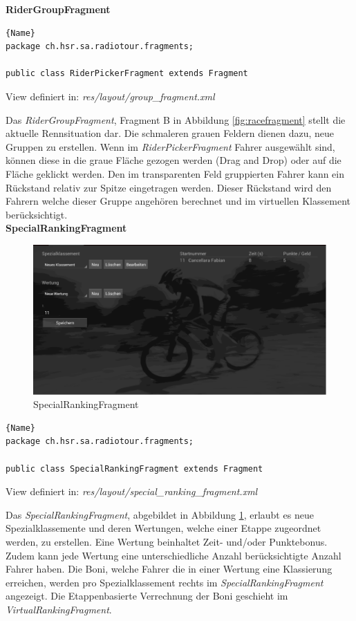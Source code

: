 \textbf{RiderGroupFragment}
\begin{lstlisting}{Name}
package ch.hsr.sa.radiotour.fragments;

public class RiderPickerFragment extends Fragment
\end{lstlisting}


View definiert in:
\textit{res/layout/group\_fragment.xml}

Das \textit{RiderGroupFragment}, Fragment B in Abbildung \ref{fig:racefragment} stellt die aktuelle Rennsituation dar. Die schmaleren grauen Feldern dienen dazu, neue Gruppen zu erstellen. Wenn im \textit{RiderPickerFragment} Fahrer ausgewählt sind, können diese in die graue Fläche gezogen werden (Drag and Drop) oder auf die Fläche geklickt werden.
Den im transparenten Feld gruppierten Fahrer kann ein Rückstand relativ zur Spitze eingetragen werden. Dieser Rückstand wird den Fahrern welche dieser Gruppe angehören berechnet und im virtuellen Klassement berücksichtigt.
\\

\textbf{SpecialRankingFragment}
\begin{figure}[h!]
\caption{SpecialRankingFragment}
\label{fig:specialrankingfragment}
\centering
\includegraphics[scale=0.8]{07anhang/images/dev_specialranking.png}
\end{figure}


\begin{lstlisting}{Name}
package ch.hsr.sa.radiotour.fragments;

public class SpecialRankingFragment extends Fragment
\end{lstlisting}

View definiert in:
\textit{res/layout/special\_ranking\_fragment.xml}

Das \textit{SpecialRankingFragment}, abgebildet in Abbildung \ref{fig:specialrankingfragment}, erlaubt es neue Spezialklassemente und deren Wertungen, welche einer Etappe zugeordnet werden, zu erstellen. Eine Wertung beinhaltet Zeit- und/oder Punktebonus. Zudem kann jede Wertung eine unterschiedliche Anzahl berücksichtigte Anzahl Fahrer haben. Die Boni, welche Fahrer die in einer Wertung eine Klassierung erreichen, werden pro Spezialklassement rechts im \textit{SpecialRankingFragment} angezeigt. Die Etappenbasierte Verrechnung der Boni geschieht im \textit{VirtualRankingFragment}.




